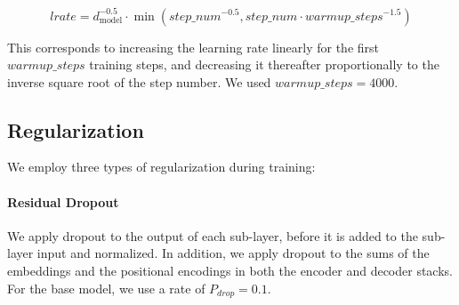 \documentclass{article}
\newcommand{\dmodel}{d_{\text{model}}}
\begin{document}
\begin{equation}
lrate = \dmodel^{-0.5} \cdot
  \min({step\_num}^{-0.5},
    {step\_num} \cdot {warmup\_steps}^{-1.5})
\end{equation}

This corresponds to increasing the learning rate linearly for the first $warmup\_steps$ training steps, and decreasing it thereafter proportionally to the inverse square root of the step number.  We used $warmup\_steps=4000$.

\subsection{Regularization} \label{sec:reg}

We employ three types of regularization during training: 
\paragraph{Residual Dropout} We apply dropout \citep{srivastava2014dropout} to the output of each sub-layer, before it is added to the sub-layer input and normalized.   In addition, we apply dropout to the sums of the embeddings and the positional encodings in both the encoder and decoder stacks.  For the base model, we use a rate of $P_{drop}=0.1$.


\end{document}
